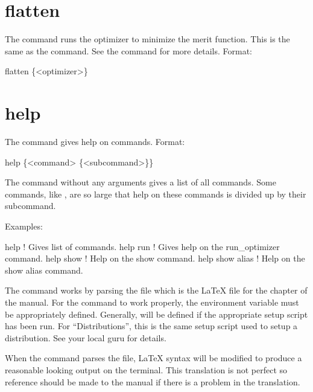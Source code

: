 \section{flatten}
\label{s:flatten}

The  command runs the optimizer to minimize the merit function. This is the same as the
 command.  See the  command for more details. Format:
\begin{example}
  flatten \{<optimizer>\}
\end{example}

\vskip 10pt

\section{help}
\label{s:help}

The  command gives help on \tao commands. Format:
\begin{example}
  help \{<command> \{<subcommand>\}\}
\end{example}

\vskip 10pt
The  command without any arguments gives a list of all commands.  Some commands, like
, are so large that help on these commands is divided up by their subcommand.

Examples:
\begin{example}
  help            ! Gives list of commands.
  help run        ! Gives help on the run_optimizer command.
  help show       ! Help on the show command.
  help show alias ! Help on the show alias command.
\end{example}

The  command works by parsing the file  which is the
LaTeX file for the  chapter of the \tao manual. For the  command to work
properly, the environment variable  must be appropriately defined. Generally,
 will be defined if the appropriate \bmad setup script has been run. For
``Distributions'', this is the same setup script used to setup a distribution. See your local \bmad
guru for details.

When the  command parses the  file, LaTeX syntax will be
modified to produce a reasonable looking output on the terminal. This translation is not perfect so
reference should be made to the \tao manual if there is a problem in the translation.

